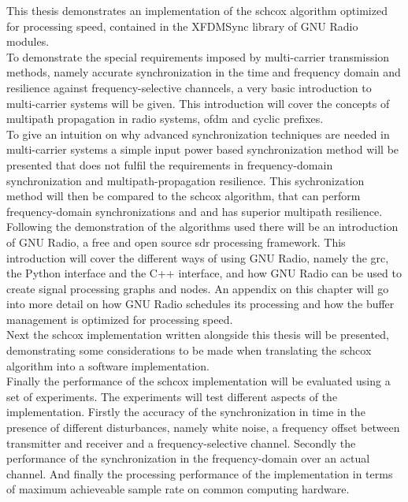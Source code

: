 This thesis demonstrates an implementation of the \acrshort{schcox}
algorithm optimized for processing speed, contained in
the XFDMSync \cite{xfdmsyncweb} library of GNU Radio modules. \\

To demonstrate the special requirements imposed by multi-carrier
transmission methods, namely accurate synchronization in the
time and frequency domain and resilience against frequency-selective channcels,
a very basic introduction to multi-carrier systems will be given.
This introduction will cover the concepts of multipath propagation
in radio systems, \acrshort{ofdm} and cyclic prefixes. \\

To give an intuition on why advanced synchronization techniques
are needed in multi-carrier systems a simple input power based
synchronization method will be presented that does not fulfil the requirements
in frequency-domain synchronization and multipath-propagation resilience.
This sychronization method will then be compared to the \acrlong{schcox}
algorithm, that can perform frequency-domain synchronizations and
and has superior multipath resilience. \\

Following the demonstration of the algorithms used there will be
an introduction of GNU Radio, a free and open source \gls{sdr}
processing framework.
This introduction will cover the different ways of using GNU Radio,
namely the \acrlong{grc}, the Python interface and the C++ interface,
and how GNU Radio can be used to create signal processing graphs
and nodes.
An appendix on this chapter will go into more detail on how
GNU Radio schedules its processing and how the buffer management
is optimized for processing speed. \\

Next the \acrlong{schcox} implementation written alongside
this thesis will be presented, demonstrating some considerations
to be made when translating the \acrshort{schcox} algorithm
into a software implementation. \\

Finally the performance of the \acrshort{schcox} implementation
will be evaluated using a set of experiments.
The experiments will test different aspects of the implementation.
Firstly the accuracy of the synchronization in time in the presence
of different disturbances, namely white noise, a frequency offset
between transmitter and receiver and a frequency-selective channel.
Secondly the performance of the synchronization in the frequency-domain
over an actual channel.
And finally the processing performance of the implementation
in terms of maximum achieveable sample rate on common computing
hardware. \\
